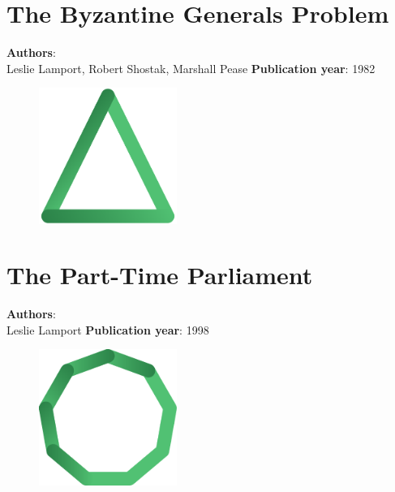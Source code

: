 \documentclass[11pt,fleqn]{book} %
\begin{document}
\chapter{The Byzantine Generals Problem}
\vspace*{-7mm}
\Large \textbf{Authors}: \\
Leslie Lamport, Robert Shostak, Marshall Pease
\newline\newline
\textbf{Publication year}: 1982
\begin{figure}[b]
    \centering
    \includegraphics[width=0.4\textwidth]{distributed-systems-triangle.pdf}
\end{figure}


\chapter{The Part-Time Parliament}
\vspace*{-7mm}
\Large \textbf{Authors}: \\
Leslie Lamport
\newline\newline
\textbf{Publication year}: 1998
\begin{figure}[b]
    \centering
    \includegraphics[width=0.4\textwidth]{distributed-systems.pdf}
\end{figure}

\end{document}
